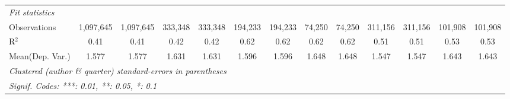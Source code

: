 \begin{tabular}{lcccccccccccc}
   \midrule
   \emph{Fit statistics}\\
   Observations                             & 1,097,645     & 1,097,645 & 333,348        & 333,348  & 194,233       & 194,233         & 74,250         & 74,250       & 311,156        & 311,156      & 101,908       & 101,908\\  
   R$^2$                                    & 0.41          & 0.41      & 0.42           & 0.42     & 0.62          & 0.62            & 0.62           & 0.62         & 0.51           & 0.51         & 0.53          & 0.53\\  
Mean(Dep. Var.) & 1.577 & 1.577 & 1.631 & 1.631 & 1.596 & 1.596 & 1.648 & 1.648 & 1.547 & 1.547 & 1.643 & 1.643 \\
   \midrule \midrule
   \multicolumn{13}{l}{\emph{Clustered (author \& quarter) standard-errors in parentheses}}\\
   \multicolumn{13}{l}{\emph{Signif. Codes: ***: 0.01, **: 0.05, *: 0.1}}\\
\end{tabular}
\par\endgroup
